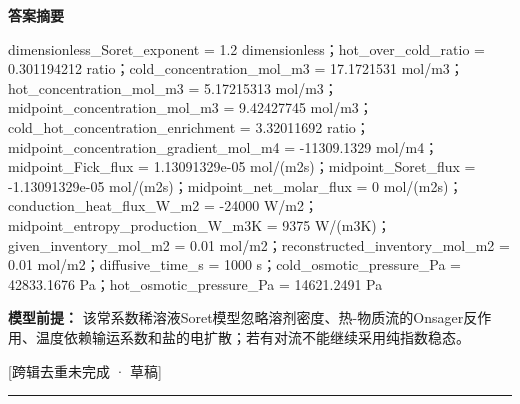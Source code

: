 \documentclass[UTF8,11pt,a4paper]{ctexart}
\begin{document}
\noindent\textbf{答案摘要}\par
dimensionless\_Soret\_exponent = 1.2 dimensionless；hot\_over\_cold\_ratio = 0.301194212 ratio；cold\_concentration\_mol\_m3 = 17.1721531 mol/m3；hot\_concentration\_mol\_m3 = 5.17215313 mol/m3；midpoint\_concentration\_mol\_m3 = 9.42427745 mol/m3；cold\_hot\_concentration\_enrichment = 3.32011692 ratio；midpoint\_concentration\_gradient\_mol\_m4 = -11309.1329 mol/m4；midpoint\_Fick\_flux = 1.13091329e-05 mol/(m2s)；midpoint\_Soret\_flux = -1.13091329e-05 mol/(m2s)；midpoint\_net\_molar\_flux = 0 mol/(m2s)；conduction\_heat\_flux\_W\_m2 = -24000 W/m2；midpoint\_entropy\_production\_W\_m3K = 9375 W/(m3K)；given\_inventory\_mol\_m2 = 0.01 mol/m2；reconstructed\_inventory\_mol\_m2 = 0.01 mol/m2；diffusive\_time\_s = 1000 s；cold\_osmotic\_pressure\_Pa = 42833.1676 Pa；hot\_osmotic\_pressure\_Pa = 14621.2491 Pa\par
\noindent\textbf{模型前提：}
该常系数稀溶液Soret模型忽略溶剂密度、热-物质流的Onsager反作用、温度依赖输运系数和盐的电扩散；若有对流不能继续采用纯指数稳态。\par
\noindent\textcolor{red!65!black}{[跨辑去重未完成 · 草稿]} \par
\medskip\hrule\medskip
{}
\end{document}
